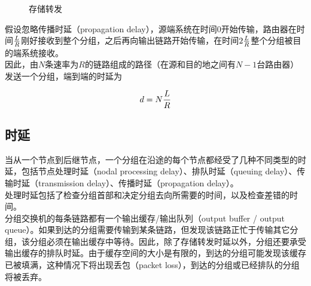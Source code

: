 \begin{figure}[H]
    \centering
    \caption{存储转发}
\end{figure}

假设忽略传播时延（propagation delay），源端系统在时间0开始传输，路由器在时间$ L \over R $刚好接收到整个分组，之后再向输出链路开始传输，在时间$ 2 {L \over R} $整个分组被目的端系统接收。\\

因此，由$ N $条速率为$ R $的链路组成的路径（在源和目的地之间有$ N - 1 $台路由器）发送一个分组，端到端的时延为

\vspace{-0.5cm}

\begin{align}
    d = N {L \over R}
\end{align}

\vspace{0.5cm}

\subsection{时延}

当从一个节点到后继节点，一个分组在沿途的每个节点都经受了几种不同类型的时延，包括节点处理时延（nodal processing delay）、排队时延（queuing delay）、传输时延（transmission delay）、传播时延（propagation delay）。\\

处理时延包括了检查分组首部和决定分组去向所需要的时间，以及检查差错的时间。\\

分组交换机的每条链路都有一个输出缓存/输出队列（output buffer / output queue）。如果到达的分组需要传输到某条链路，但发现该链路正忙于传输其它分组，该分组必须在输出缓存中等待。因此，除了存储转发时延以外，分组还要承受输出缓存的排队时延。由于缓存空间的大小是有限的，到达的分组可能发现该缓存已被填满，这种情况下将出现丢包（packet loss），到达的分组或已经排队的分组将被丢弃。\\

